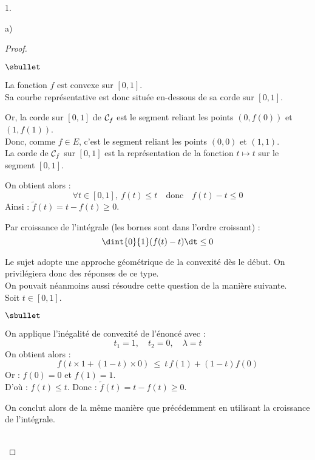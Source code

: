 \begin{noliste}{1.}
\begin{noliste}{a)}
  \begin{proof}~
    \begin{noliste}{$\sbullet$}
	\item La fonction $f$ est convexe sur $[0,1]$.\\ 
	Sa courbe 
	représentative est donc située en-dessous de sa corde sur 
	$[0,1]$.
	\item Or, la corde sur $[0,1]$ de ${\cal C}_f$ est le segment 
	reliant
	les points $(0,f(0))$ et $(1,f(1))$.\\
	Donc, comme $f\in E$, c'est le segment reliant les points 
	$(0,0)$ et $(1,1)$.\\
	La corde de ${\cal C}_f$ sur $[0,1]$ est la représentation de 
	la fonction
	$t\mapsto t$ sur le segment $[0,1]$.
	
	
	\newpage
	
	
	\item On obtient alors :
	\[
	  \forall t\in [0,1], \ f(t) \leq t \quad \text{donc} \quad 
	  f(t) -t \leq 0
	\]
	Ainsi : $\tilde{f}(t) = t-f(t) \geq 0$.
	\item Par croissance de l'intégrale (les bornes sont dans 
	l'ordre croissant) :
	\[
	  \dint{0}{1} (f(t)-t) \dt \leq 0
	\]
      \end{noliste}
    
    \begin{remark}
      Le sujet adopte une approche géométrique de la convexité dès le
      début. On privilégiera donc des réponses de ce type.\\
      On pouvait néanmoins aussi résoudre cette question de la manière 
      suivante.\\
      Soit $t\in [0,1]$.
      \begin{noliste}{$\sbullet$}
	\item On applique l'inégalité de convexité de l'énoncé avec :
	\[
	  t_1=1, \quad t_2=0, \quad \lambda = t
	\]
	On obtient alors :
	\[
	  f(t\times 1 + (1-t) \times 0) \ \leq \ t \, f(1) + (1-t) f(0)
	\]
	Or : $f(0)=0$ et $f(1)=1$. \\
	D'où :
	$
	  f(t) \leq t$. Donc : $\tilde{f}(t)=t-f(t) 
	  \geq 0.
	$
	\item On conclut alors de la même manière que précédemment en 
	utilisant la croissance de l'intégrale.
      \end{noliste}
    \end{remark}~\\[-1.4cm]
  \end{proof}


\end{noliste}
\end{noliste}
